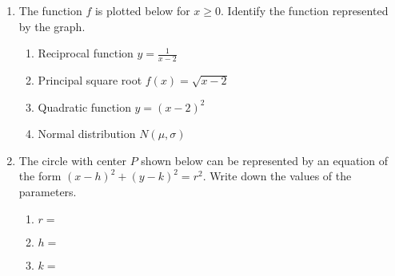 \documentclass[12pt, twoside]{article}
\begin{document}
\begin{enumerate}
\item The function $f$ is plotted below for $x \ge 0$. Identify the function represented by the graph.
\begin{multicols}{2}
  \begin{enumerate}[itemsep=0.4cm]
    \item Reciprocal function $\displaystyle y=\frac{1}{x-2}$
    \item Principal square root $f(x) = \sqrt{x-2}$
    \item Quadratic function $y=(x-2)^2$
    \item Normal distribution $N(\mu, \sigma)$
  \end{enumerate}
\begin{center} 
\end{center}
\end{multicols}

\newpage
\item The circle with center $P$ shown below can be represented by an equation of the form $(x-h)^2+(y-k)^2=r^2$. Write down the values of the parameters.
  \begin{multicols}{2}
    \begin{enumerate}
      \item $r=$
      \item $h=$
      \item $k=$ \vspace{2cm}
    \end{enumerate}
    \begin{flushright}
  \end{flushright}
  \end{multicols}


\end{enumerate}
\end{document}
